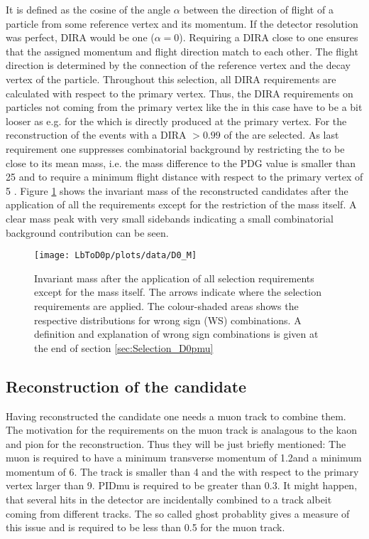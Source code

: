 It is defined as the cosine of the angle $\alpha$ between the direction of flight of a particle from some reference vertex and its momentum.
If the detector resolution was perfect, DIRA would be one ($\alpha = 0$).
Requiring a DIRA close to one ensures that the assigned momentum and flight direction match to each other.
The flight direction is determined by the connection of the reference vertex and the decay vertex of the particle.
Throughout this selection, all DIRA requirements are calculated with respect to the primary vertex.
Thus, the DIRA requirements on particles not coming from the primary vertex like the \Dz in this case have to be a bit looser as e.g. for the \Lb which is directly produced at the primary vertex.
For the reconstruction of the \Dz events with a DIRA $>0.99$ of the \Dz are selected.
As last requirement one suppresses combinatorial background by restricting the \Dz to be close to its mean mass, i.e. the mass difference to the PDG value is smaller than 25 \mev and to require a minimum \Dz flight distance with respect to the primary vertex of 5 \mm.
Figure \ref{fig:plot_mD0} shows the invariant mass of the reconstructed \Dz candidates after the application of all the requirements except for the restriction of the \Dz mass itself.
A clear mass peak with very small sidebands indicating a small combinatorial background contribution can be seen.
\begin{figure}[hptb]
	\centering
	\texttt{[image: LbToD0p/plots/data/D0\_M]}
	\caption{Invariant \Dz mass after the application of all selection requirements except for the \Dz mass itself.
             The arrows indicate where the selection requirements are applied.
             The colour-shaded areas shows the respective distributions for wrong sign (WS) combinations.
             A definition and explanation of wrong sign combinations is given at the end of section \ref{sec:Selection_D0pmu}}
	\label{fig:plot_mD0}
\end{figure}

\subsection{Reconstruction of the \Dz\mun candidate}
\label{sec:Selection_D0mu}
Having reconstructed the \Dz candidate one needs a muon track to combine them.
The motivation for the requirements on the muon track is analagous to the kaon and pion for the \Dz reconstruction.
Thus they will be just briefly mentioned:
The muon is required to have a minimum transverse momentum of 1.2\gev and a minimum momentum of 6\gev.
The track \chisqndf is smaller than 4 and the \chisqip with respect to the primary vertex larger than 9.
PIDmu is required to be greater than 0.3.
It might happen, that several hits in the detector are incidentally combined to a track albeit coming from different tracks.
The so called ghost probablity gives a measure of this issue and is required to be less than 0.5 for the muon track.


